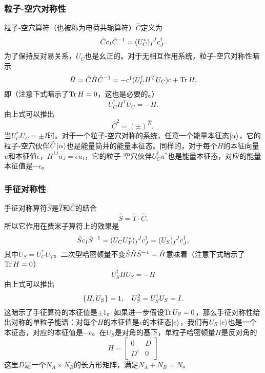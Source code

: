 \subsubsection{粒子-空穴对称性}
粒子-空穴算符（也被称为电荷共轭算符）$\hat C$定义为
\begin{equation}
  \hat C c_I \hat C\inv = (U_C^*)\indices{_I^J}c_J^\dagger.
\end{equation}
为了保持反对易关系，$U_C$也是幺正的。对于无相互作用系统，粒子-空穴对称性暗示
\begin{equation}
  \hat H = \hat C \hat H \hat C^{-1}=-c^\dagger (U_C^\dagger H^T U_C) c + \Tr H,
\end{equation}
即（注意下式暗示了$\Tr H=0$，这也是必要的。）
\begin{equation}
  U_C^\dagger H^T U_C = -H.
\end{equation}
由上式可以推出
\begin{equation}
  \hat C^2 = (\pm)^{\hat N},
\end{equation}
当$U_C^*U_C = \pm I$时。对于一个粒子-空穴对称的系统，任意一个能量本征态$\ket{\alpha}$，它的粒子-空穴伙伴$\hat C \ket{\alpha}$也是能量简并的能量本征态。同样的，对于每个$H$的本征向量$u$和本征值$\epsilon$，$H^{IJ}u_J=\epsilon u_I$，它的粒子-空穴伙伴$U^\dagger_C u^*$也是能量本征态，对应的能量本征值是$-\epsilon$。

\subsubsection{手征对称性}
手征对称算符$\hat S$是$\hat T$和$\hat C$的结合
\begin{equation}
  \hat S= \hat T\cdot \hat C.
\end{equation}
所以它作用在费米子算符上的效果是
\begin{equation}
  \hat S c_I \hat S\inv = (U_CU_T^*)\indices{_I^J}c_J^\dagger = (U_S)\indices{_I^J}c_J^\dagger,
\end{equation}
其中$U_S=U_C^*U_T$。二次型哈密顿量不变$\hat S \hat H \hat S^{-1} = \hat H$意味着（注意下式暗示了$\Tr H=0$）
\begin{equation}
  U_S^\dagger H U_S = -H
\end{equation}
由上式可以推出
\begin{equation}
  \Bqty{H,U_S}=1,\quad U_S^2 = U_S^\dagger U_S = I.
\end{equation}
这暗示了手征算符的本征值是$\pm1$。如果进一步假设$\Tr U_S = 0$，那么手征对称性给出对称的单粒子能谱：对每个$H$的本征值是$e$的本征态$\ket{e}$，我们有$U_S\ket{e}$也是一个本征态，对应的本征值是$-e$。在$U_S$是对角的基下，单粒子哈密顿量$H$是反对角的
\begin{equation}
  H = \begin{bmatrix}
      0 & D \\
      D^\dagger & 0
  \end{bmatrix}
\end{equation}
这里$D$是一个$N_A\times N_B$的长方形矩阵，满足$N_A+N_B=N$。
